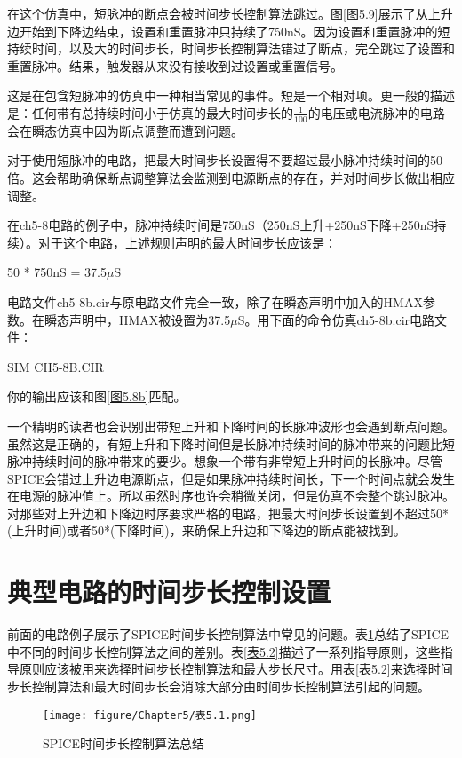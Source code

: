 在这个仿真中，短脉冲的断点会被时间步长控制算法跳过。图\ref{图5.9}展示了从上升边开始到下降边结束，设置和重置脉冲只持续了750nS。因为设置和重置脉冲的短持续时间，以及大的时间步长，时间步长控制算法错过了断点，完全跳过了设置和重置脉冲。结果，触发器从来没有接收到过设置或重置信号。

这是在包含短脉冲的仿真中一种相当常见的事件。短是一个相对项。更一般的描述是：任何带有总持续时间小于仿真的最大时间步长的$\frac{1}{100}$的电压或电流脉冲的电路会在瞬态仿真中因为断点调整而遭到问题。

对于使用短脉冲的电路，把最大时间步长设置得不要超过最小脉冲持续时间的50倍。这会帮助确保断点调整算法会监测到电源断点的存在，并对时间步长做出相应调整。

在ch5-8电路的例子中，脉冲持续时间是750nS（250nS上升+250nS下降+250nS持续）。对于这个电路，上述规则声明的最大时间步长应该是：

50 * 750nS = 37.5$\mu$S

电路文件ch5-8b.cir与原电路文件完全一致，除了在瞬态声明中加入的HMAX参数。在瞬态声明中，HMAX被设置为37.5$\mu$S。用下面的命令仿真ch5-8b.cir电路文件：

SIM CH5-8B.CIR

你的输出应该和图\ref{图5.8b}匹配。

一个精明的读者也会识别出带短上升和下降时间的长脉冲波形也会遇到断点问题。虽然这是正确的，有短上升和下降时间但是长脉冲持续时间的脉冲带来的问题比短脉冲持续时间的脉冲带来的要少。想象一个带有非常短上升时间的长脉冲。尽管SPICE会错过上升边电源断点，但是如果脉冲持续时间长，下一个时间点就会发生在电源的脉冲值上。所以虽然时序也许会稍微关闭，但是仿真不会整个跳过脉冲。对那些对上升边和下降边时序要求严格的电路，把最大时间步长设置到不超过50*(上升时间)或者50*(下降时间)，来确保上升边和下降边的断点能被找到。

\section{典型电路的时间步长控制设置}
前面的电路例子展示了SPICE时间步长控制算法中常见的问题。表\ref{表5.1}总结了SPICE中不同的时间步长控制算法之间的差别。表\ref{表5.2}描述了一系列指导原则，这些指导原则应该被用来选择时间步长控制算法和最大步长尺寸。用表\ref{表5.2}来选择时间步长控制算法和最大时间步长会消除大部分由时间步长控制算法引起的问题。

\begin{figure}[htbp]
\small
    \centering
    \texttt{[image: figure/Chapter5/表5.1.png]}
    \caption{SPICE时间步长控制算法总结}
    \label{表5.1}
\end{figure}

